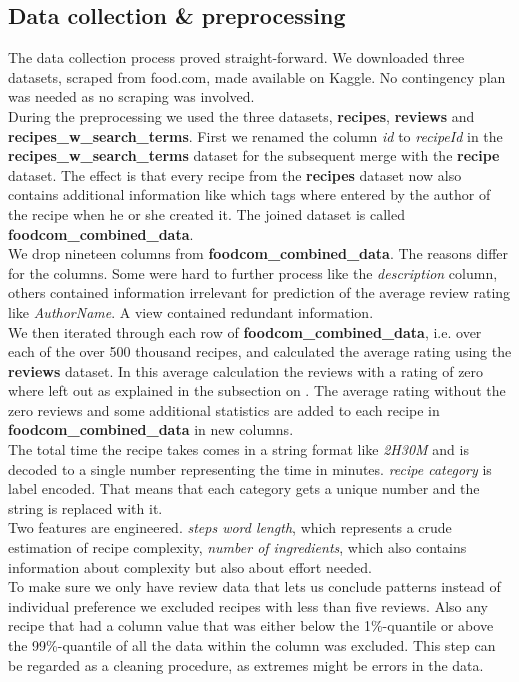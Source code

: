 \documentclass{article}
\begin{document}
\subsection{Data collection \& preprocessing}
The data collection process proved straight-forward. We downloaded three datasets\cite{kaggle:reviews}\cite{kaggle:recipes}\cite{kaggle:searchterms}, scraped from food.com, made available on Kaggle. No contingency plan was needed as no scraping was involved.\\
During the preprocessing we used the three datasets, \textbf{recipes}, \textbf{reviews} and \textbf{recipes\_w\_search\_terms}. First we renamed the column \textit{id} to \textit{recipeId} in the \textbf{recipes\_w\_search\_terms} dataset for the subsequent merge with the \textbf{recipe} dataset. The effect is that every recipe from the \textbf{recipes} dataset now also contains additional information like which tags where entered by the author of the recipe when he or she created it. The joined dataset is called \textbf{foodcom\_combined\_data}.\\
We drop nineteen columns from \textbf{foodcom\_combined\_data}. The reasons differ for the columns. Some were hard to further process like the \textit{description} column, others contained information irrelevant for prediction of the average review rating like \textit{AuthorName}. A view contained redundant information.\\ 
We then iterated through each row of \textbf{foodcom\_combined\_data}, i.e. over each of the over 500 thousand recipes, and calculated the average rating using the \textbf{reviews} dataset. In this average calculation the reviews with a rating of zero where left out as explained in the subsection on . The average rating without the zero reviews and some additional statistics are added to each recipe in \textbf{foodcom\_combined\_data} in new columns. \\
The total time the recipe takes comes in a string format like \textit{2H30M} and is decoded to a single number representing the time in minutes. \textit{recipe category} is label encoded. That means that each category gets a unique number and the string is replaced with it.\\
Two features are engineered. \textit{steps word length}, which represents a crude estimation of recipe complexity, \textit{number of ingredients}, which also contains information about complexity but also about effort needed.\\
To make sure we only have review data that lets us conclude patterns instead of individual preference we excluded recipes with less than five reviews. Also any recipe that had a column value that was either below the 1\%-quantile or above the 99\%-quantile of all the data within the column was excluded. This step can be regarded as a cleaning procedure, as extremes might be errors in the data.\\
\end{document}
